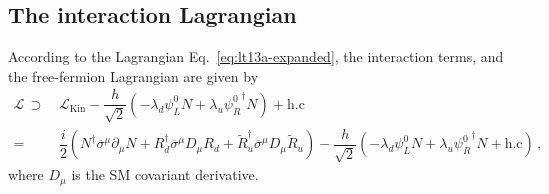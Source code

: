\subsection{The interaction Lagrangian}
%
According to the Lagrangian Eq.~\eqref{eq:lt13a-expanded}, the interaction terms, and the free-fermion Lagrangian  are given by
%
\begin{align}
\label{eq:lint1}
\mathcal{L} \, \supset \, &\mathcal{L}_{\text{Kin}}
- \dfrac{h}{\sqrt{2}}\left(-\lambda_d\psi_L^0N + \lambda_u{\psi_R^0}^{\dagger}N\right)+\text{h.c}\nonumber\\
= \, & \dfrac{i}{2}\left(N^{\dagger}\overline{\sigma}^{\mu}\partial_{\mu}N 
+  R_d^{\dagger}\overline{\sigma}^{\mu}D_{\mu}R_d 
+  \widetilde{R}_u^{\dagger}\overline{\sigma}^{\mu}D_{\mu}\widetilde{R}_u \right)
- \dfrac{h}{\sqrt{2}}\left(-\lambda_d\psi_L^0N + \lambda_u{\psi_R^0}^{\dagger}N+\text{h.c}\right)\,,
\end{align}
%
where $D_{\mu}$ is the SM covariant derivative. 


